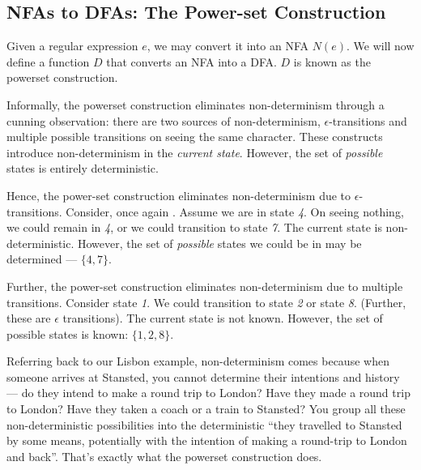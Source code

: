 \subsection{NFAs to DFAs: The Power-set Construction}
Given a regular expression $e$, we may convert it into an NFA $N(e)$. We will now define a function $D$ that converts an NFA into a DFA. $D$ is known as the powerset construction. 

Informally, the powerset construction eliminates non-determinism through a cunning observation: there are two sources of non-determinism, $\epsilon$-transitions and multiple possible transitions on seeing the same character. These constructs introduce non-determinism in the \emph{current state}. However, the set of \emph{possible} states is entirely deterministic. 

Hence, the power-set construction eliminates non-determinism due to $\epsilon$-transitions. Consider, once again . Assume we are in state \textit{4}. On seeing nothing, we could remain in \textit{4}, or we could transition to state \textit{7}. The current state is non-deterministic. However, the set of \emph{possible} states we could be in may be determined --- $\{ \textit{4}, \textit{7} \}$. 

Further, the power-set construction eliminates non-determinism due to multiple transitions. Consider state \textit{1}. We could transition to state \textit{2} or state \textit{8}. (Further, these are $\epsilon$ transitions). The current state is not known. However, the set of possible states is known: $\{ \textit{1}, \textit{2}, \textit{8} \}$.

Referring back to our Lisbon example, non-determinism comes because when someone arrives at Stansted, you cannot determine their intentions and history --- do they intend to make a round trip to London? Have they made a round trip to London? Have they taken a coach or a train to Stansted? You group all these non-deterministic possibilities into the deterministic ``they travelled to Stansted by some means, potentially with the intention of making a round-trip to London and back''. That's exactly what the powerset construction does.

